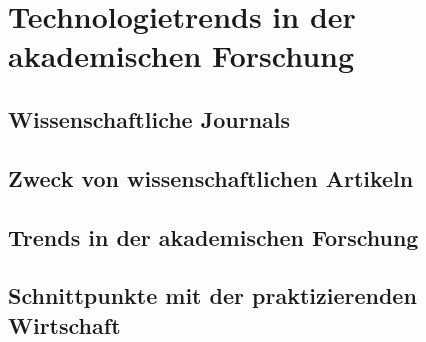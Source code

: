 \section{Technologietrends in der akademischen Forschung}
\subsection{Wissenschaftliche Journals}
\subsection{Zweck von wissenschaftlichen Artikeln}
\subsection{Trends in der akademischen Forschung}
\subsection{Schnittpunkte mit der praktizierenden Wirtschaft}